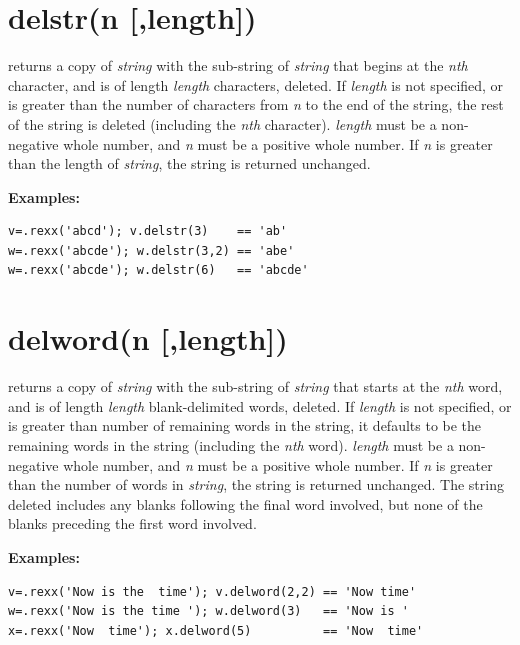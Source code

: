 \section{delstr(n [,length{]})}\label{refdelstr}

returns a copy of \emph{string} with the sub-string of
\emph{string} that begins at the \emph{n}\emph{th} character, and is
of length \emph{length} characters, deleted.
If \emph{length} is not specified, or is greater than the number of
characters from \emph{n} to the end of the string, the rest of the
string is deleted (including the \emph{n}\emph{th} character).
\emph{length} must be a non-negative whole number, and \emph{n}
must be a positive whole number.  If \emph{n} is greater than the
length of \emph{string}, the string is returned unchanged.
 
\textbf{Examples:}
\begin{lstlisting}
v=.rexx('abcd'); v.delstr(3)    == 'ab'
w=.rexx('abcde'); w.delstr(3,2) == 'abe'
w=.rexx('abcde'); w.delstr(6)   == 'abcde'
\end{lstlisting}
\section{delword(n [,length])}\label{refdelword}

returns a copy of \emph{string} with the sub-string of
\emph{string} that starts at the \emph{n}\emph{th} word, and is of
length \emph{length} blank-delimited words, deleted.
If \emph{length} is not specified, or is greater than number of
remaining words in the string, it defaults to be the remaining words
in the string (including the \emph{n}\emph{th} word).
\emph{length} must be a non-negative whole number, and \emph{n}
must be a positive whole number.  If \emph{n} is greater than the
number of words in \emph{string}, the string is returned unchanged.
The string deleted includes any blanks following the final word
involved, but none of the blanks preceding the first word involved.
 
\textbf{Examples:}
\begin{lstlisting}
v=.rexx('Now is the  time'); v.delword(2,2) == 'Now time'
w=.rexx('Now is the time '); w.delword(3)   == 'Now is '
x=.rexx('Now  time'); x.delword(5)          == 'Now  time'
\end{lstlisting}

